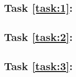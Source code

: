%

\setcounter{taskCount}{0}

\label{task:1}
\subsection{Task \ref{task:1}: }

\label{task:2}
\subsection{Task \ref{task:2}: }


\label{task:3}
\subsection{Task \ref{task:3}: }
